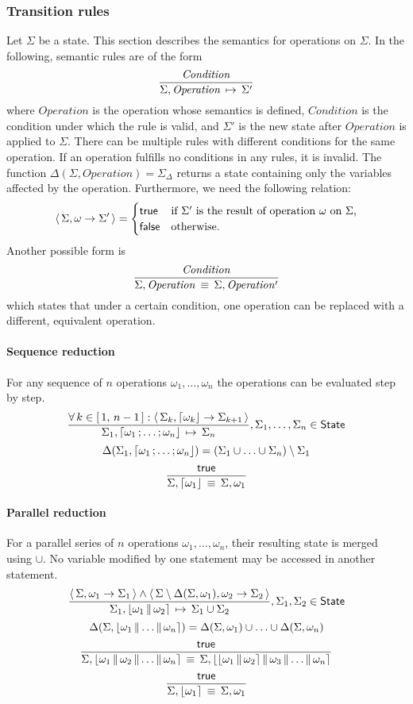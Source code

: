 \subsubsection{Transition rules}
Let $\Sigma$ be a state.
This section describes the semantics for operations on $\Sigma$.
In the following, semantic rules are of the form
	$$\frac{\mathit{Condition}}{{\Sigma, \mathit{Operation}} \,\mapsto\, \Sigma'}$$
	where
		$\mathit{Operation}$ is the operation whose semantics is defined,
		$\mathit{Condition}$ is the condition under which the rule is valid, and
		$\Sigma'$ is the new state after $\mathit{Operation}$ is applied to $\Sigma$.
There can be multiple rules with different conditions for the same operation.
If an operation fulfills no conditions in any rules, it is invalid.
The function $\Delta(\Sigma, \mathit{Operation}) = \Sigma_\Delta$ returns a state containing only the variables affected by the operation.
Furthermore, we need the following relation:
$$\left\langle\, \Sigma, \omega \to \Sigma' \,\right\rangle = \begin{cases}
	\mathsf{true} & \text{if $\Sigma'$ is the result of operation $\omega$ on $\Sigma$,} \\
	\mathsf{false} & \text{otherwise.}
\end{cases}
$$
Another possible form is
$$
\frac{\mathit{Condition}}{\Sigma, \mathit{Operation} \,\equiv\, \Sigma, \mathit{Operation'}}
$$
which states that under a certain condition, one operation can be replaced with a different, equivalent operation.

\paragraph{Sequence reduction}
For any sequence of $n$ operations $\omega_1, \ldots, \omega_n$ the operations can be evaluated step by step.
$$
\semrule{
	\forall\, k \in \range{1}{n-1}: \results{\Sigma_k}{\stmt{\omega_k}}{\Sigma_{k+1}}}
	{\Sigma_1, \stmt{\omega_1}{\ldots}{\omega_n}}
	{\Sigma_n},
	\Sigma_1, \ldots, \Sigma_n \in \State
$$
$$
	\Delta(\Sigma_1, \stmt{\omega_1}{\ldots}{\omega_n}) =
		(\Sigma_1 \cup \ldots \cup \Sigma_n) \setminus \Sigma_1
$$
$$
\semruleeq{\true}
	{\Sigma, \stmt{\omega_1}}
	{\Sigma, \omega_1}
$$

\paragraph{Parallel reduction}
For a parallel series of $n$ operations $\omega_1, \ldots, \omega_n$, their resulting state is merged using $\cup$.
No variable modified by one statement may be accessed in another statement.
$$
	\semrule{
		\results{\Sigma}{\omega_1}{\Sigma_1} \land
		\results{\Sigma \setminus \Delta(\Sigma, \omega_1)}{\omega_2}{\Sigma_2}}
		{\Sigma_1, \parstmt{\omega_1}{\omega_2}}
		{\Sigma_1 \cup \Sigma_2},
			\Sigma_1, \Sigma_2 \in \State
$$
$$
	\Delta(\Sigma, \parstmt{\omega_1}{\ldots}{\omega_n}) = \Delta(\Sigma, \omega_1) \cup \ldots \cup \Delta(\Sigma, \omega_n)
$$
$$
	\semruleeq{\true}
		{\Sigma, \parstmt{\omega_1}{\omega_2}{\ldots}{\omega_n}}
		{\Sigma, \parstmt{\parstmt{\omega_1}{\omega_2}}{\omega_3}{\ldots}{\omega_n}}
$$
$$
\semruleeq{\true}
	{\Sigma, \parstmt{\omega_1}}
	{\Sigma, \omega_1}
$$

